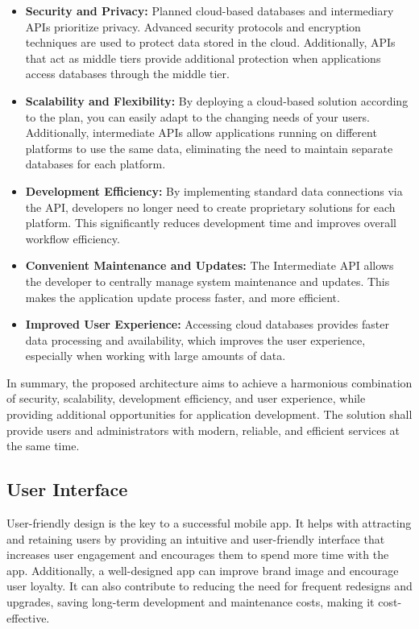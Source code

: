 \begin{itemize}
	\item \textbf{Security and Privacy:} Planned cloud-based databases and intermediary APIs prioritize privacy. Advanced security protocols and encryption techniques are used to protect data stored in the cloud. Additionally, APIs that act as middle tiers provide additional protection when applications access databases through the middle tier.
	
	\item \textbf{Scalability and Flexibility:} By deploying a cloud-based solution according to the  plan, you can easily adapt to the changing needs of your users.
	Additionally,  intermediate APIs allow applications running on different platforms to use the same data, eliminating the need to maintain separate databases for each platform.
	
	\item \textbf{Development Efficiency:} By implementing standard data connections via the  API,  developers no longer need to create proprietary solutions for each platform.
	This significantly reduces development time and improves overall workflow efficiency.
	
	\item \textbf{Convenient Maintenance and Updates:} The Intermediate API allows the developer to centrally manage system maintenance and updates. This makes the application update process faster, and more efficient.
	
	\item \textbf{Improved User Experience:} Accessing cloud databases provides faster data processing and availability, which improves the user experience, especially when working with large amounts of data.
\end{itemize}
 
In summary, the proposed architecture aims to achieve a harmonious combination of security, scalability, development efficiency, and user experience, while providing additional opportunities for application development. The solution shall provide users and administrators with modern, reliable, and efficient services at the same time.

\subsection{User Interface}

User-friendly design is the key to a successful mobile app. It helps with attracting and retaining users by providing an intuitive and user-friendly interface that increases user engagement and encourages them to spend more time with the app. Additionally, a well-designed app can improve brand image and encourage user loyalty. It can also contribute to reducing the need for frequent redesigns and upgrades, saving long-term development and maintenance costs, making it cost-effective. 

